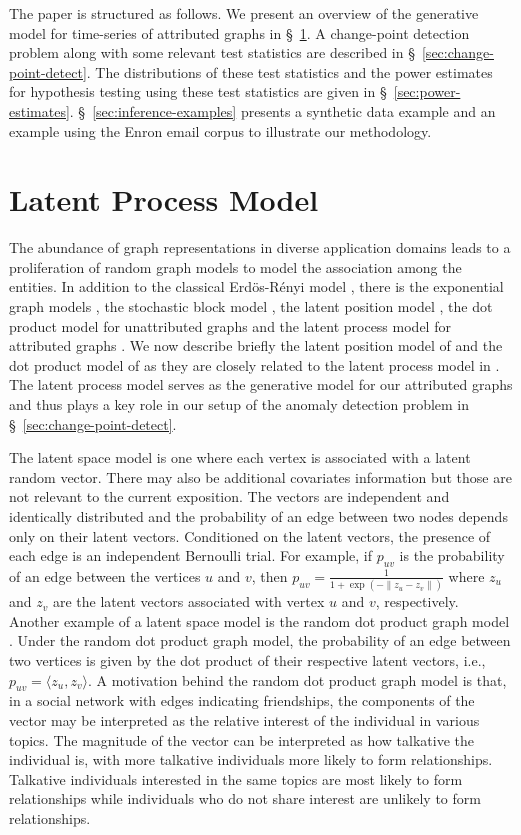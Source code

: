 \documentclass[10pt,draftclsnofoot,onecolumn]{IEEEtran}
\theoremstyle{definition}
\begin{document}
The paper is structured as follows. We present an overview of the
generative model for time-series of attributed graphs \cite{lee11} in
\S~\ref{sec:latent-process-model}. A change-point detection problem
along with some relevant test statistics are described in
\S~\ref{sec:change-point-detect}. The distributions of these test
statistics and the power estimates for hypothesis testing using
these test statistics are given in \S~\ref{sec:power-estimates}. 
\S~\ref{sec:inference-examples} presents a
synthetic data example and an example using the Enron email corpus to
illustrate our methodology. 

\section{Latent Process Model}
\label{sec:latent-process-model}
The abundance of graph representations in diverse application domains
leads to a proliferation of random graph models to model the
association among the entities. In addition to the classical
Erd\"{o}s-R\'{e}nyi model \cite{Erdos1959}, there is the exponential
graph models \cite{holland81}, the stochastic block model
\cite{Holland1983,Wang1987}, the latent position model
\cite{hoff02:_laten}, the dot product model for unattributed graphs
\cite{young07:_random} and the latent process model for attributed
graphs \cite{lee11}. We now describe briefly the latent position model
of \cite{hoff02:_laten} and the dot product model of
\cite{young07:_random} as they are closely related to the latent
process model in \cite{lee11}. The latent process model serves as
the generative model for our attributed graphs and thus plays a
key role in our setup of the anomaly detection problem in 
\S~\ref{sec:change-point-detect}.

The latent space model is one where each vertex is associated with a
latent random vector. There may also be additional covariates
information but those are not relevant to the current exposition. The
vectors are independent and identically distributed and the
probability of an edge between two nodes depends only on their latent
vectors. Conditioned on the latent vectors, the presence of each edge
is an independent Bernoulli trial. For example, if $p_{uv}$ is the
probability of an edge between the vertices $u$ and $v$, then $p_{uv}
= \tfrac{1}{1 + \exp( - \|z_u - z_v\|)}$ where $z_u$ and $z_v$ are the
latent vectors associated with vertex $u$ and $v$, respectively.
Another example of a latent space model is the random dot product
graph model \cite{young07:_random}. Under the random dot product graph
model, the probability of an edge between two vertices is given
by the dot product of their respective latent vectors, i.e., $p_{uv} =
\langle z_u, z_v \rangle$. A motivation behind the random dot
product graph model is that, in a social network with edges
indicating friendships, the components of the vector may be
interpreted as the relative interest of the individual in various
topics. The magnitude of the vector can be interpreted as how
talkative the individual is, with more talkative individuals more
likely to form relationships. Talkative individuals interested in the
same topics are most likely to form relationships while individuals
who do not share interest are unlikely to form relationships.
\end{document}
